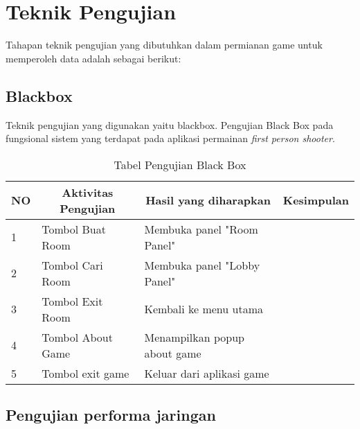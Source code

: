 \newpage
\section{Teknik Pengujian}
\noindent

Tahapan teknik pengujian yang dibutuhkan dalam permianan game 
\judulId untuk memperoleh data adalah sebagai berikut:

\subsection{Blackbox}
Teknik pengujian yang digunakan yaitu blackbox. Pengujian Black Box pada fungsional sistem yang terdapat pada aplikasi permainan \textit{first person shooter}.

    \begin{table}[h]
    \centering
    \caption{Tabel Pengujian Black Box}
    \label{lab:tabel-pengujian}
    \begin{tabular}{|l|l|l|l|}
    \hline
    \multicolumn{1}{|c|}{NO} & \multicolumn{1}{c|}{Aktivitas Pengujian} & \multicolumn{1}{c|}{Hasil yang diharapkan} & \multicolumn{1}{c|}{Kesimpulan} \\ \hline
    1                        & Tombol Buat Room                         & Membuka panel "Room Panel"                 &                                 \\ \hline
    2                        & Tombol Cari Room                         & Membuka panel "Lobby Panel"                &                                 \\ \hline
    3                        & Tombol Exit Room                         & Kembali ke menu utama                      &                                 \\ \hline
    4                        & Tombol About Game                        & Menampilkan popup about game               &                                 \\ \hline
    5                        & Tombol exit game                         & Keluar dari aplikasi game                  &                                 \\ \hline
    \end{tabular}
    \end{table}
\newpage        
\subsection{Pengujian performa jaringan}
\noindent

